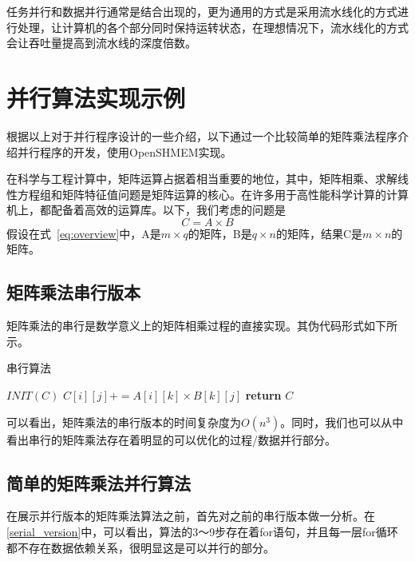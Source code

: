 任务并行和数据并行通常是结合出现的，更为通用的方式是采用流水线化的方式进行处理，让计算机的各个部分同时保持运转状态，在理想情况下，流水线化的方式会让吞吐量提高到流水线的深度倍数\cite{book:sourcebook}。

\section{并行算法实现示例}
根据以上对于并行程序设计的一些介绍，以下通过一个比较简单的矩阵乘法程序介绍并行程序的开发，使用OpenSHMEM实现。

在科学与工程计算中，矩阵运算占据着相当重要的地位，其中，矩阵相乘、求解线性方程组和矩阵特征值问题是矩阵运算的核心。在许多用于高性能科学计算的计算机上，都配备着高效的运算库。以下，我们考虑的问题是
\begin{equation}\label{eq:overview}
C = A \times B
\end{equation}
假设在式~\ref{eq:overview}中，A是\begin{math}m \times q\end{math}的矩阵，B是\begin{math}q \times n\end{math}的矩阵，结果C是\begin{math}m \times n\end{math}的矩阵。

\subsection{矩阵乘法串行版本}
矩阵乘法的串行是数学意义上的矩阵相乘过程的直接实现。其伪代码形式如下所示。

\begin{algorithm}
\hline
\caption{串行算法}\label{serial_version} 
\hline
\begin{algorithmic}[5]
\State $INIT(C)$
			\Begin
			\State $C[i][j] += A[i][k] \times B[k][j]$ 
			\End
		\EndFor
	\EndFor
\EndFor
\State \textbf{return} $C$
\EndFunction
\end{algorithmic}
\end{algorithm}
\hline

可以看出，矩阵乘法的串行版本的时间复杂度为$O(n^3)$。同时，我们也可以从中看出串行的矩阵乘法存在着明显的可以优化的过程/数据并行部分。

\subsection{简单的矩阵乘法并行算法}\label{subsec:simple_parallel}
\setcounter{matrix_count}{0}
在展示并行版本的矩阵乘法算法之前，首先对之前的串行版本做一分析。在\ref{serial_version}中，可以看出，算法的3～9步存在着for语句，并且每一层for循环都不存在数据依赖关系，很明显这是可以并行的部分。

